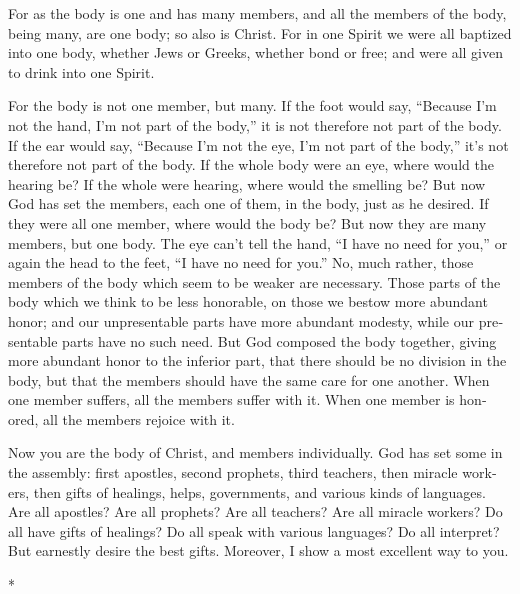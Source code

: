 \begin{paracol}{2}
\begin{otherlanguage}{english}
 For as the body is one and has many members, and all the
members of the body, being many, are one body; so also is Christ.
 For in one Spirit we were all baptized into one body,
whether Jews or Greeks, whether bond or free; and were all given to
drink into one Spirit.

 For the body is not one member, but many.
 If the foot would say, ``Because I'm not the hand, I'm
not part of the body,'' it is not therefore not part of the body.
 If the ear would say, ``Because I'm not the eye, I'm not
part of the body,'' it's not therefore not part of the body.
 If the whole body were an eye, where would the hearing
be? If the whole were hearing, where would the smelling be?
 But now God has set the members, each one of them, in
the body, just as he desired.  If they were all one
member, where would the body be?  But now they are many
members, but one body.  The eye can't tell the hand, ``I
have no need for you,'' or again the head to the feet, ``I have no need
for you.''  No, much rather, those members of the body
which seem to be weaker are necessary.  Those parts of
the body which we think to be less honorable, on those we bestow more
abundant honor; and our unpresentable parts have more abundant modesty,
 while our presentable parts have no such need. But God
composed the body together, giving more abundant honor to the inferior
part,  that there should be no division in the body, but
that the members should have the same care for one another.
 When one member suffers, all the members suffer with it.
When one member is honored, all the members rejoice with it.

 Now you are the body of Christ, and members
individually.  God has set some in the assembly: first
apostles, second prophets, third teachers, then miracle workers, then
gifts of healings, helps, governments, and various kinds of languages.
 Are all apostles? Are all prophets? Are all teachers?
Are all miracle workers?  Do all have gifts of healings?
Do all speak with various languages? Do all interpret? 
But earnestly desire the best gifts. Moreover, I show a most excellent
way to you.

\end{otherlanguage}

\switchcolumn[0]*


\end{paracol}
